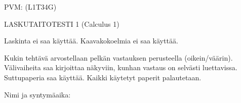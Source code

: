 \documentclass[finnish, a4paper, 12pt]{article}
\begin{document}
	
	
		PVM: \underline{\phantom{mm.mm.}}
		\hfill
		(L1T34G)	%
	
	\begin{center}
		{\large
			LASKUTAITOTESTI 1 (Calculus 1)}
	\end{center}
	
	Laskinta ei saa käyttää. Kaavakokoelmia ei saa käyttää.
	
	Kukin tehtävä arvostellaan pelkän vastauksen perusteella (oikein/väärin).
	Välivaiheita saa kirjoittaa näkyviin, kunhan vastaus on selvästi luettavissa.
	Suttupaperia saa käyttää. Kaikki käytetyt paperit palautetaan.
	
\vspace{12pt}
Nimi ja syntymäaika: \phantom{m} \hrulefill
\vspace{8pt}
	
\end{document}
